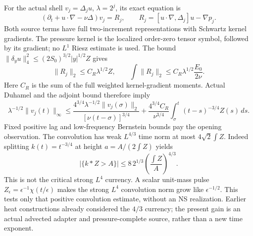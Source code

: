 \documentclass[11pt]{article}
\begin{document}
For the actual shell $v_j=\Delta_j u$, $\lambda=2^j$, its exact equation is
\[
 (\partial_t+u\cdot\nabla-\nu\Delta)v_j=R_j,
 \qquad R_j=[u\cdot\nabla,\Delta_j]u-\nabla p_j.
\]
Both source terms have full two-increment representations with Schwartz
kernel gradients. The pressure kernel is the localized order-zero tensor
symbol, followed by its gradient; no $L^1$ Riesz estimate is used.
The bound $\|\delta_yu\|_4^2\le(2S_0)^{3/2}|y|^{1/2}Z$ gives
\[
 \|R_j\|_2\le C_R\lambda^{1/2}Z,\qquad
 \int\|R_j\|_2\le C_R\lambda^{1/2}\frac{E_0}{2\nu}.
\]
Here $C_R$ is the sum of the full weighted kernel-gradient moments.
Actual Duhamel and the adjoint bound therefore imply
\[
 \lambda^{-1/2}\|v_j(t)\|_\infty
 \le\frac{4^{3/4}\lambda^{-1/2}\|v_j(\sigma)\|_2}
          {[\nu(t-\sigma)]^{3/4}}
 +\frac{4^{3/4}C_R}{\nu^{3/4}}
       \int_\sigma^t(t-s)^{-3/4}Z(s)\,ds.
\]
Fixed positive lag and low-frequency Bernstein bounds pay the opening
observation. The convolution has weak $L^{4/3}$ time norm at most
$4\sqrt2\int Z$. Indeed splitting $k(t)=t^{-3/4}$ at height
$a=A/(2\int Z)$ yields
\[
 |\{k*Z>A\}|\le8\,2^{1/3}\left(\frac{\int Z}{A}\right)^{4/3}.
\]
This is not the critical strong $L^4$ currency. A scalar unit-mass pulse
$Z_\epsilon=\epsilon^{-1}\chi(t/\epsilon)$ makes the strong $L^4$
convolution norm grow like $\epsilon^{-1/2}$. This tests only that positive
convolution estimate, without an NS realization. Earlier heat constructions
already considered the $4/3$ currency; the present gain is an actual advected
adapter and pressure-complete source, rather than a new time exponent.
\end{document}
